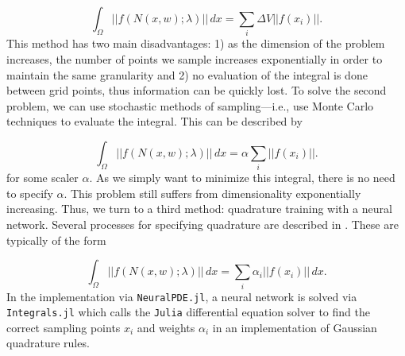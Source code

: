 \documentclass{CUP-JNL-DTM}%
\theoremstyle{definition}
\numberwithin{equation}{section}
\newcommand{\Julia}{\texttt{Julia} }
\begin{document}
\begin{equation}
	\int_{\Omega} ||f(N(x,w); \lambda)||\,dx = \sum_i \Delta V ||f(x_i)||.
\end{equation}
This method has two main disadvantages: 1) as the dimension of the problem increases, the number of points we sample increases exponentially in order to maintain the same granularity and 2) no evaluation of the integral is done between grid points, thus information can be quickly lost. To solve the second problem, we can use stochastic methods of sampling---i.e., use Monte Carlo techniques to evaluate the integral. This can be described by 

\begin{equation}
	\int_{\Omega} ||f(N(x,w); \lambda)||\,dx = \alpha \sum_i ||f(x_i)||.
\end{equation}
for some scaler $\alpha$. As we simply want to minimize this integral, there is no need to specify $\alpha$. This problem still suffers from dimensionality exponentially increasing. Thus, we turn to a third method: quadrature training with a neural network. Several processes for specifying quadrature are described in \cite{riveraQuadratureRulesSolving2022}. These are typically of the form 

\begin{equation}
	\int_{\Omega} ||f(N(x,w); \lambda)||\,dx = \sum_i \alpha_i ||f(x_i)||\,dx.
\end{equation}
In the implementation via \texttt{NeuralPDE.jl}, a neural network is solved via \texttt{Integrals.jl} which calls the \Julia differential equation solver \cite{rackauckasDifferentialEquationsJlPerformant2017} to find the correct sampling points $x_i$ and weights $\alpha_i$ in an implementation of Gaussian quadrature rules. 
\end{document}
